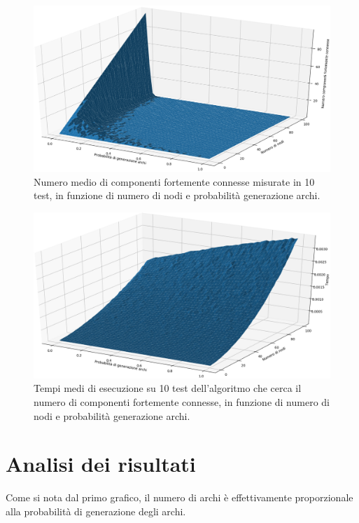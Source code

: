 \documentclass[]{article}
\begin{document}
\begin{center}
\begin{figure}[H]
	\includegraphics[width=\linewidth]{grafici/numSCC.png}
	\caption{Numero medio di componenti fortemente connesse misurate in 10 test, in funzione di numero di nodi e probabilità generazione archi.}
	\label{imgNumeroSCC}
\end{figure}
\end{center}

\begin{center}
\begin{figure}[H]
	\includegraphics[width=\linewidth]{grafici/execTimes.png}
	\caption{Tempi medi di esecuzione su 10 test dell'algoritmo che cerca il numero di componenti fortemente connesse, in funzione di numero di nodi e probabilità generazione archi.}
	\label{imgTempiEsecuzione}
\end{figure}
\end{center}


\section{Analisi dei risultati}
Come si nota dal primo grafico, il numero di archi è effettivamente proporzionale alla probabilità di generazione degli archi.
\end{document}
